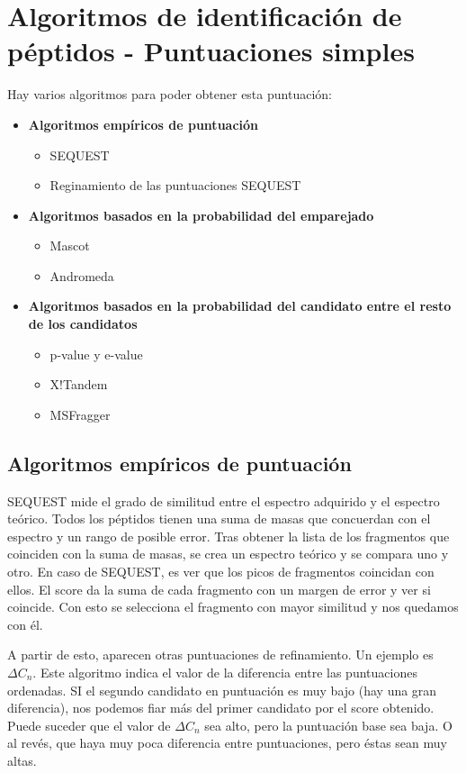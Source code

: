 \section{Algoritmos de identificación de péptidos - Puntuaciones simples}
Hay varios algoritmos para poder obtener esta puntuación:
\begin{itemize}
\item \textbf{Algoritmos empíricos de puntuación}
\begin{itemize}
\item SEQUEST
\item Reginamiento de las puntuaciones SEQUEST
\end{itemize}
\item \textbf{Algoritmos basados en la probabilidad del emparejado}
\begin{itemize}
\item Mascot
\item Andromeda
\end{itemize}
\item \textbf{Algoritmos basados en la probabilidad del candidato entre el resto de los candidatos}
\begin{itemize}
\item p-value y e-value
\item X!Tandem
\item MSFragger
\end{itemize}
\end{itemize}

\subsection{Algoritmos empíricos de puntuación}
SEQUEST mide el grado de similitud entre el espectro adquirido y el espectro teórico. Todos los péptidos tienen una suma de masas que concuerdan con el espectro y un rango de posible error. Tras obtener la lista de los fragmentos que coinciden con la suma de masas, se crea un espectro teórico y se compara uno y otro. En caso de SEQUEST, es ver que los picos de fragmentos coincidan con ellos. El score da la suma de cada fragmento con un margen de error y ver si coincide. Con esto se selecciona el fragmento con mayor similitud y nos quedamos con él. 

A partir de esto, aparecen otras puntuaciones de refinamiento. Un ejemplo es $\Delta C_n$. Este algoritmo indica el valor de la diferencia entre las puntuaciones ordenadas. SI el segundo candidato en puntuación es muy bajo (hay una gran diferencia), nos podemos fiar más del primer candidato por el score obtenido. Puede suceder que el valor de $\Delta C_n$ sea alto, pero la puntuación base sea baja. O al revés, que haya muy poca diferencia entre puntuaciones, pero éstas sean muy altas. 

